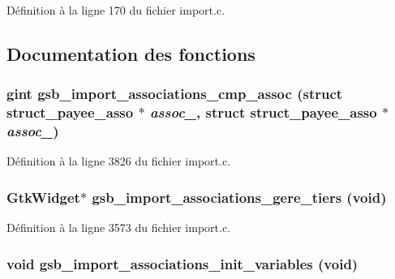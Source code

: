 Définition à la ligne 170 du fichier import.c.



\subsection{Documentation des fonctions}
\subsubsection[{gsb\_\-import\_\-associations\_\-cmp\_\-assoc}]{\setlength{\rightskip}{0pt plus 5cm}gint gsb\_\-import\_\-associations\_\-cmp\_\-assoc (struct {\bf struct\_\-payee\_\-asso} $\ast$ {\em assoc\_}, \/  struct {\bf struct\_\-payee\_\-asso} $\ast$ {\em assoc\_})}\label{import_8c_a973a66dc9a88ed606bd0936f32919a4f}


Définition à la ligne 3826 du fichier import.c.

\subsubsection[{gsb\_\-import\_\-associations\_\-gere\_\-tiers}]{\setlength{\rightskip}{0pt plus 5cm}GtkWidget$\ast$ gsb\_\-import\_\-associations\_\-gere\_\-tiers (void)}\label{import_8c_aeedd1884f94db09625397f7714850f82}


Définition à la ligne 3573 du fichier import.c.

\subsubsection[{gsb\_\-import\_\-associations\_\-init\_\-variables}]{\setlength{\rightskip}{0pt plus 5cm}void gsb\_\-import\_\-associations\_\-init\_\-variables (void)}\label{import_8c_af8486d8bf4c57369bd528eb5c4474cb5}



